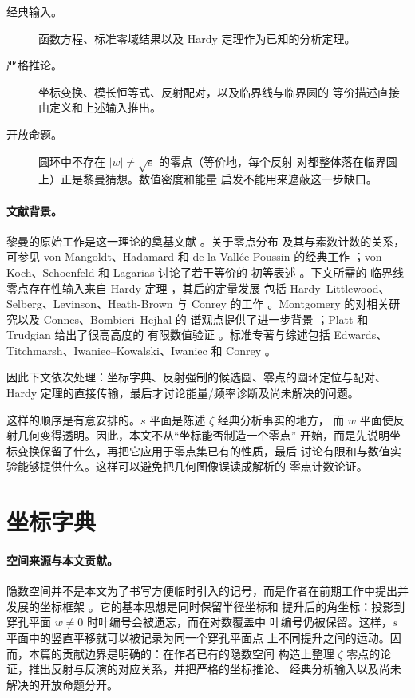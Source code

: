 \documentclass[submission,noinfoline]{jsfds}
\begin{document}
\begin{description}
\item[经典输入。] 函数方程、标准零域结果以及 Hardy 定理作为已知的分析定理。
\item[严格推论。] 坐标变换、模长恒等式、反射配对，以及临界线与临界圆的
等价描述直接由定义和上述输入推出。
\item[开放命题。] 圆环中不存在 $|w|\neq\sqrt e$ 的零点（等价地，每个反射
对都整体落在临界圆上）正是黎曼猜想。数值密度和能量
启发不能用来遮蔽这一步缺口。
\end{description}

\paragraph{文献背景。}
黎曼的原始工作是这一理论的奠基文献 \citep{Riemann1859}。关于零点分布
及其与素数计数的关系，可参见 von Mangoldt、Hadamard 和 de la Vall{\'e}e
Poussin 的经典工作 \citep{vonMangoldt1905,Hadamard1893,
deLaValleePoussin1899}；von Koch、Schoenfeld 和 Lagarias 讨论了若干等价的
初等表述 \citep{vonKoch1901,Schoenfeld1976,Lagarias2002}。下文所需的
临界线零点存在性输入来自 Hardy 定理 \citep{Hardy1914}，其后的定量发展
包括 Hardy--Littlewood、Selberg、Levinson、Heath-Brown 与 Conrey 的工作
\citep{HardyLittlewood1921,Selberg1942,Levinson1974,HeathBrown1979,
Conrey1989}。Montgomery 的对相关研究以及 Connes、Bombieri--Hejhal 的
谱观点提供了进一步背景 \citep{Montgomery1973,Montgomery1977,
Connes1999,BombieriHejhal1995}；Platt 和 Trudgian 给出了很高高度的
有限数值验证 \citep{PlattTrudgian2021}。标准专著与综述包括 Edwards、
Titchmarsh、Iwaniec--Kowalski、Iwaniec 和 Conrey
\citep{Edwards1974,Titchmarsh1986,IwaniecKowalski2004,Iwaniec2014,
Conrey2003}。

因此下文依次处理：坐标字典、反射强制的候选圆、零点的圆环定位与配对、
Hardy 定理的直接传输，最后才讨论能量/频率诊断及尚未解决的问题。

这样的顺序是有意安排的。$s$ 平面是陈述 $\zeta$ 经典分析事实的地方，
而 $w$ 平面使反射几何变得透明。因此，本文不从“坐标能否制造一个零点”
开始，而是先说明坐标变换保留了什么，再把它应用于零点集已有的性质，最后
讨论有限和与数值实验能够提供什么。这样可以避免把几何图像误读成解析的
零点计数论证。

\section{坐标字典}\label{sec:coords}

\paragraph{空间来源与本文贡献。}
隐数空间并不是本文为了书写方便临时引入的记号，而是作者在前期工作中提出并
发展的坐标框架 \citep{LiuXu2026bridge}。它的基本思想是同时保留半径坐标和
提升后的角坐标：投影到穿孔平面 $w\neq0$ 时叶编号会被遗忘，而在对数覆盖中
叶编号仍被保留。这样，$s$ 平面中的竖直平移就可以被记录为同一个穿孔平面点
上不同提升之间的运动。因而，本篇的贡献边界是明确的：在作者已有的隐数空间
构造上整理 $\zeta$ 零点的论证，推出反射与反演的对应关系，并把严格的坐标推论、
经典分析输入以及尚未解决的开放命题分开。
\end{document}
